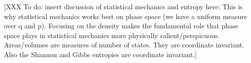 \documentclass[letterpaper]{article}
\begin{document}

[XXX To do: insert discussion of statistical mechanics and entropy here: This is why statistical mechanics works best on phase space (we have a uniform measure over q and p). Focusing on the density makes the fundamental role that phase space plays in statistical mechanics more physically salient/perspicuous. Areas/volumes are measures of number of states. They are coordinate invariant. Also the Shannon and Gibbs entropies are coordinate invariant.]
\end{document}
